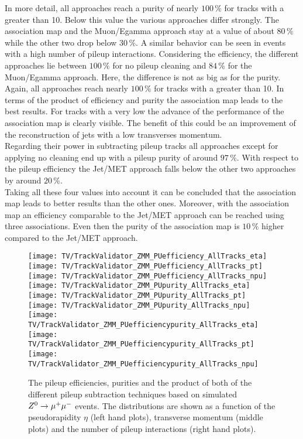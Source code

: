 In more detail, all approaches reach a purity of nearly $100\,\%$ for tracks with a \pt greater than 10\GeV. Below this value the various approaches differ strongly. The association map and the Muon/Egamma approach stay at a value of about $80\,\%$ while the other two drop below $30\,\%$. A similar behavior can be seen in events with a high number of pileup interactions. Considering the efficiency, the different approaches lie between $100\,\%$ for no pileup cleaning and $84\,\%$ for the Muon/Egamma approach. Here, the difference is not as big as for the purity. Again, all approaches reach nearly $100\,\%$ for tracks with a \pt greater than 10\GeV. In terms of the product of efficiency and purity the association map leads to the best results. For tracks with a very low \pt{} the advance of the performance of the association map is clearly visible. The benefit of this could be an improvement of the reconstruction of jets with a low transverses momentum.\\
Regarding their power in subtracting pileup tracks all approaches except for applying no cleaning end up with a pileup purity of around $97\,\%$. With respect to the pileup efficiency the Jet/MET approach falls below the other two approaches by around $20\,\%$.\\
Taking all these four values into account it can be concluded that the association map leads to better results than the other ones. Moreover, with the association map an efficiency comparable to the Jet/MET approach can be reached using three associations. Even then the purity of the association map is $10\,\%$ higher compared to the Jet/MET approach.

\begin{figure}[Ht]
    \centering
    \texttt{[image: TV/TrackValidator\_ZMM\_PUefficiency\_AllTracks\_eta]}
    \texttt{[image: TV/TrackValidator\_ZMM\_PUefficiency\_AllTracks\_pt]}
    \texttt{[image: TV/TrackValidator\_ZMM\_PUefficiency\_AllTracks\_npu]}
    \\
    \texttt{[image: TV/TrackValidator\_ZMM\_PUpurity\_AllTracks\_eta]}
    \texttt{[image: TV/TrackValidator\_ZMM\_PUpurity\_AllTracks\_pt]}
    \texttt{[image: TV/TrackValidator\_ZMM\_PUpurity\_AllTracks\_npu]}
    \\
    \texttt{[image: TV/TrackValidator\_ZMM\_PUefficiencypurity\_AllTracks\_eta]}
    \texttt{[image: TV/TrackValidator\_ZMM\_PUefficiencypurity\_AllTracks\_pt]}
    \texttt{[image: TV/TrackValidator\_ZMM\_PUefficiencypurity\_AllTracks\_npu]}
    \caption[Pileup efficiencies, purities and their product of the different pileup subtraction techniques based on simulated $\Zz\rightarrow\MM$ events]{The pileup efficiencies, purities and the product of both of the different pileup subtraction techniques based on simulated $\Zz\rightarrow\MM$ events. The distributions are shown as a function of the pseudorapidity $\eta$ (left hand plots), transverse momentum (middle plots) and the number of pileup interactions (right hand plots). \label{plot:TACOAACPZMMPileup}}
\end{figure}


